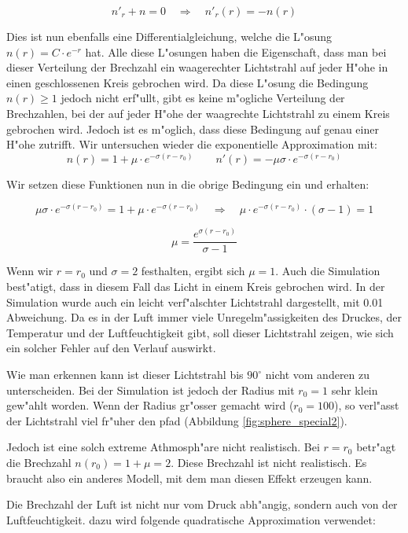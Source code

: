 \begin{refsection}
$$n'_r + n = 0 \quad \Rightarrow \quad n'_r(r) = -n(r)$$

Dies ist nun ebenfalls eine Differentialgleichung, welche die L"osung $n(r) = C \cdot e^{-r}$ hat.
Alle diese L"osungen haben die Eigenschaft, dass man bei dieser Verteilung der Brechzahl ein waagerechter Lichtstrahl auf jeder H"ohe in einen geschlossenen Kreis gebrochen wird.
Da diese L"osung die Bedingung $n(r) \geq 1$ jedoch nicht erf"ullt, gibt es keine m"ogliche Verteilung der Brechzahlen, bei der auf jeder H"ohe der waagrechte Lichtstrahl zu einem Kreis gebrochen wird. 
Jedoch ist es m"oglich, dass diese Bedingung auf genau einer H"ohe zutrifft. 
Wir untersuchen wieder die exponentielle Approximation mit:
$$n(r) = 1 + \mu \cdot e^{-\sigma (r-r_0)} \qquad n'(r) = -\mu \sigma \cdot e^{-\sigma (r-r_0)}$$

Wir setzen diese Funktionen nun in die obrige Bedingung ein und erhalten:

$$\mu \sigma \cdot e^{-\sigma (r-r_0)} = 1 + \mu \cdot e^{-\sigma (r-r_0)} \quad \Rightarrow \quad \mu \cdot e^{-\sigma (r-r_0)} \cdot (\sigma - 1) = 1$$

$$\mu = \frac{e^{\sigma (r-r_0)}}{\sigma - 1}$$

Wenn wir $r = r_0$ und $\sigma = 2$ festhalten, ergibt sich $\mu = 1$. 
Auch die Simulation best"atigt, dass in diesem Fall das Licht in einem Kreis gebrochen wird.
In der Simulation wurde auch ein leicht verf"alschter Lichtstrahl dargestellt, mit 0.01 Abweichung. 
Da es in der Luft immer viele Unregelm"assigkeiten des Druckes, der Temperatur und der Luftfeuchtigkeit gibt, soll dieser Lichtstrahl zeigen, wie sich ein solcher Fehler auf den Verlauf auswirkt.

Wie man erkennen kann ist dieser Lichtstrahl bis $90^\circ$ nicht vom anderen zu unterscheiden.
Bei der Simulation ist jedoch der Radius mit $r_0=1$ sehr klein gew"ahlt worden. 
Wenn der Radius gr"osser gemacht wird ($r_0 = 100$), so  verl"asst der Lichtstrahl viel fr"uher den pfad (Abbildung \ref{fig:sphere_special2}). 

Jedoch ist eine solch extreme Athmosph"are nicht realistisch. 
Bei $r = r_0$ betr"agt die Brechzahl $n(r_0) = 1 + \mu = 2$. 
Diese Brechzahl ist nicht realistisch. 
Es braucht also ein anderes Modell, mit dem man diesen Effekt erzeugen kann.

Die Brechzahl der Luft ist nicht nur vom Druck abh"angig, sondern auch von der Luftfeuchtigkeit. 
dazu wird folgende quadratische Approximation verwendet:


\end{refsection}
